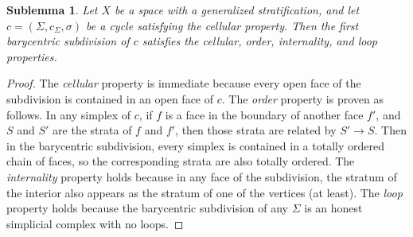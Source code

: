 \documentclass[psamsfonts]{amsart}
\newtheorem{sublemma}[theorem]{Sublemma}
\theoremstyle{remark}
\begin{document}
\begin{sublemma}\label{bary}
Let $X$ be a space with a generalized stratification, and let $c = (\Sigma, c_\Sigma, \sigma)$ be a cycle satisfying the \emph{cellular} property.  Then the first barycentric subdivision of $c$ satisfies the \emph{cellular}, \emph{order}, \emph{internality}, and \emph{loop} properties.
\end{sublemma}

\begin{proof}
The \emph{cellular} property is immediate because every open face of the subdivision is contained in an open face of $c$.  The \emph{order} property is proven as follows.  In any simplex of $c$, if $f$ is a face in the boundary of another face $f'$, and $S$ and $S'$ are the strata of $f$ and $f'$, then those strata are related by $S' \rightarrow S$.  Then in the barycentric subdivision, every simplex is contained in a totally ordered chain of faces, so the corresponding strata are also totally ordered.  The \emph{internality} property holds because in any face of the subdivision, the stratum of the interior also appears as the stratum of one of the vertices (at least).  The \emph{loop} property holds because the barycentric subdivision of any $\Sigma$ is an honest simplicial complex with no loops.
\end{proof}
\end{document}
